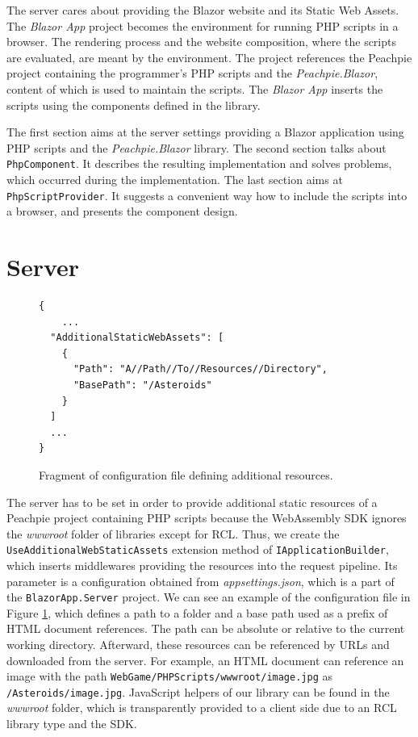 The server cares about providing the Blazor website and its Static Web Assets.
The \textit{Blazor App} project becomes the environment for running PHP scripts in a browser.
The rendering process and the website composition, where the scripts are evaluated, are meant by the environment.
The project references the Peachpie project containing the programmer's PHP scripts and the \textit{Peachpie.Blazor},  content of which is used to maintain the scripts.
The \textit{Blazor App} inserts the scripts using the components defined in the library.
\par
The first section aims at the server settings providing a Blazor application using PHP scripts and the \textit{Peachpie.Blazor} library.
The second section talks about \texttt{PhpComponent}.
It describes the resulting implementation and solves problems, which occurred during the implementation.
The last section aims at \texttt{PhpScript\-Provider}.
It suggests a convenient way how to include the scripts into a browser, and presents the component design.

\section{Server}

\begin{figure}[b!]
\begin{lstlisting}
{
	...
  "AdditionalStaticWebAssets": [
    {
      "Path": "A//Path//To//Resources//Directory",
      "BasePath": "/Asteroids"
    }
  ]
  ...
}

\end{lstlisting}
\caption{Fragment of configuration file defining additional resources.}
\label{img19:settings}
\end{figure}
\par
The server has to be set in order to provide additional static resources of a Peachpie project containing PHP scripts because the WebAssembly SDK ignores the \textit{wwwroot} folder of libraries except for RCL.
Thus, we create the \texttt{UseAdd\-itionalWebStaticAssets} extension method of \texttt{IApplicationBuilder}, which inserts middlewares providing the resources into the request pipeline.
Its parameter is a configuration obtained from \textit{appsettings.json}, which is a part of the \texttt{BlazorApp.Server} project.
We can see an example of the configuration file in Figure \ref{img19:settings}, which defines a path to a folder and a base path used as a prefix of HTML document references.
The path can be absolute or relative to the current working directory.
Afterward, these resources can be referenced by URLs and downloaded from the server.
For example, an HTML document can reference an image with the path \texttt{WebGame/PHPScripts/wwwroot/image.jpg} as \texttt{/Asteroids/image.jpg}.
JavaScript helpers of our library can be found in the \textit{wwwroot} folder, which is transparently provided to a client side due to an RCL library type and the SDK.

